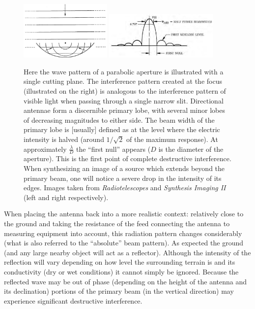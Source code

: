 \begin{figure}[ht]
 \begin{mdframed}
  \centering
  \includegraphics[width=0.4\textwidth]{images/diffraction_pattern.png}
  \includegraphics[width=0.5\textwidth]{images/radiation_pattern.png}
  \caption[Collection of electromagnetic wave energy and response]{Here the wave pattern of a parabolic aperture is 
  illustrated with a single cutting plane. The interference pattern created at the focus (illustrated on the right) is analogous to the interference pattern 
  of visible light when passing through a single narrow slit. Directional antennae form a discernible primary lobe, with several minor lobes of decreasing magnitudes to
  either side. The beam width of the primary lobe is [usually] defined as at the level where the electric intensity is halved (around $1/\sqrt{2}$ of the maximum response).
  At approximately $\frac{\lambda}{D}$ the ``first null'' appears ($D$ is the diameter of the aperture). This is the first point of complete destructive interference. When synthesizing
  an image  of a source which extends beyond the primary beam, one will notice a severe drop in the intensity of its edges. Images taken from \textit{Radiotelescopes} \cite{christiansenradiotelescopes} 
  and \textit{Synthesis Imaging II} \cite{taylor1999synthesis} (left and right respectively).}
  \label{diffraction_pattern}
 \end{mdframed}
\end{figure}

When placing the antenna back into a more realistic context: relatively close to the ground and taking the resistance of the feed connecting the antenna
to measuring equipment into account, this radiation pattern changes considerably (what is also referred to the ``absolute'' beam pattern).
As expected the ground (and any large nearby object will act as a reflector). Although the intensity of the reflection will vary depending
on how level the surrounding terrain is and its conductivity (dry or wet conditions) it cannot simply be ignored. Because the reflected wave may
be out of phase (depending on the height of the antenna and its declination) portions of the primary beam (in the vertical direction) 
may experience significant destructive interference.

